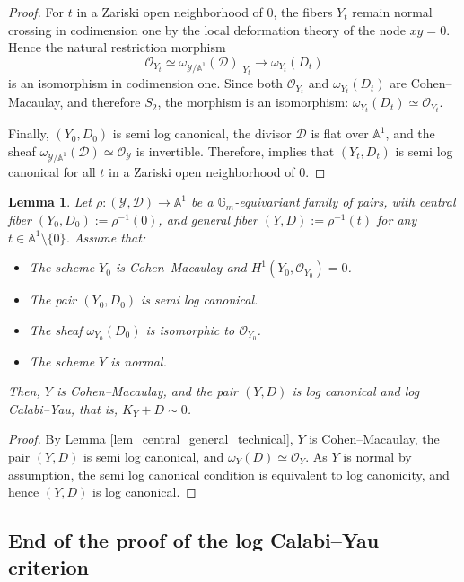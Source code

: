 \documentclass[12pt,letterpaper, reqno]{amsart}
\newtheorem{lemma}[theorem]{Lemma}
\theoremstyle{defstyle} \newtheorem{definition}[theorem]{Definition}
\theoremstyle{remark}
\numberwithin{equation}{section}
\numberwithin{figure}{section}
\newcommand{\A} {\mathbb{A}}
\newcommand{\G} {\mathbb{G}}
\newcommand{\cO} {\mathcal{O}}
\newcommand{\cY} {\mathcal{Y}}
\newcommand{\cD} {\mathcal{D}}
\begin{document}
\begin{proof}
For $t$ in a Zariski open neighborhood of $0$, the fibers $Y_t$ remain normal crossing in codimension one by the local deformation theory of the node $xy=0$. Hence the natural restriction morphism
\[
\mathcal O_{Y_t}
\simeq
\omega_{\mathcal Y/\A^1}(\mathcal D)\big|_{Y_t}
\longrightarrow
\omega_{Y_t}(D_t)
\]
is an isomorphism in codimension one. Since both $\mathcal O_{Y_t}$ and $\omega_{Y_t}(D_t)$ are Cohen--Macaulay, and therefore $S_2$, the morphism is an isomorphism:
$
\omega_{Y_t}(D_t)
\simeq
\mathcal O_{Y_t}$. 

Finally, $(Y_0,D_0)$ is semi log canonical, the divisor $\mathcal D$ is flat over $\A^1$, and the sheaf $\omega_{\mathcal Y/\A^1}(\mathcal D)\simeq\mathcal O_{\mathcal Y}$ is invertible.
Therefore, \cite[Corollary~4.45]{kollar2023families-of-varieties} implies that $(Y_t,D_t)$ is semi log canonical for all $t$ in a Zariski open neighborhood of $0$.
\end{proof}


\begin{lemma} \label{lem_central_general}
Let
$\rho: (\cY, \cD) \rightarrow \A^1$ be a $\G_m$-equivariant family of pairs, with central fiber $(Y_0, D_0):=\rho^{-1}(0)$, and general fiber $(Y,D):=\rho^{-1}(t)$ for any  $t \in \A^1 \setminus \{0\}$. Assume that:
\begin{itemize}
    \item[(i)] The scheme $Y_0$ is Cohen--Macaulay and $H^1(Y_0, \cO_{Y_0})=0$.
    \item[(ii)] The pair $(Y_0, D_0)$ is semi log canonical.
    \item[(iii)] The sheaf $\omega_{Y_0}(D_0)$ is isomorphic to $\cO_{Y_0}$.
    \item[(iv)] The scheme $Y$ is normal.
\end{itemize}
Then, $Y$ is Cohen--Macaulay, and the pair $(Y,D)$ is log canonical and log Calabi--Yau, that is, $K_Y +D \sim 0$.
\end{lemma}

\begin{proof}
By Lemma \ref{lem_central_general_technical}, \(Y\) is Cohen--Macaulay, the pair \((Y,D)\) is semi log canonical, and \(\omega_Y(D) \simeq \mathcal{O}_Y\). As \(Y\) is normal by assumption, the semi log canonical condition is equivalent to log canonicity, and hence \((Y,D)\) is log canonical.
\end{proof}



\subsection{End of the proof of the  log Calabi--Yau criterion}
\label{section_end_proof}
\end{document}
